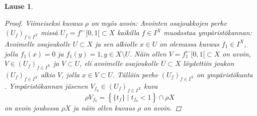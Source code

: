 \documentclass[12pt,a4paper,leqno]{report}
\theoremstyle{plain}
\newtheorem{lause}[equation]{Lause}
\theoremstyle{definition}
\theoremstyle{remark}
\begin{document}
\begin{lause}
\begin{proof}
Viimeiseksi kuvaus $\rho$ on myös avoin: 
Avointen osajoukkojen perhe 
$(U_f)_{f\in I^X}$ missä ${U_f=f^\leftarrow [0,1[\subset X}$ kaikilla $ f\in I^X$ 
muodostaa ympäristökannan: 
Avoimelle osajoukolle $U\subset X$ ja sen alkiolle $x\in U$ 
on olemassa kuvaus $f_1\in I^X$, 
jolla $f_1(x)=0$ ja $f_1(y)=1,y\in X\setminus U$. 
Näin ollen ${V=f_1^\leftarrow [0,1[\subset X}$ on avoin,
$V\in (U_f)_{f\in I^X}$ ja $V\subset U$, 
eli avoimelle osajoukolle ${U\subset X}$ löydettiin joukon
$(U_f)_{f\in I^X}$ alkio $V$, jolla $x\in V\subset U$. 
Tällöin perhe $(U_f)_{f\in I^X}$ on ympäristökanta \cite[lause~2.4~ja~2.15]{Topo2}. 
Ympäristökannan jäsenen $V_{f_0}\in (U_f)_{f\in I^X}$ kuva 
$$\rho V_{f_0}=\left\{\{t_f\}\mid t_{f_0}<1\right\}\cap \rho X$$
on avoin joukossa $\rho X$ ja näin ollen kuvaus $\rho$ on avoin.
\end{proof}
\end{lause}
\end{document}
